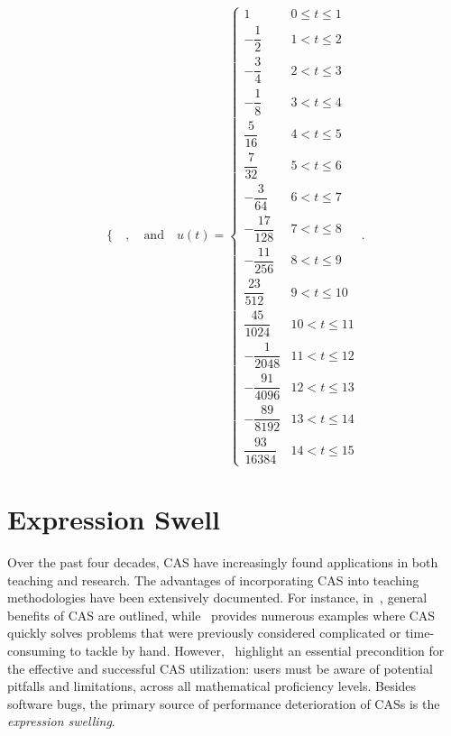 \begin{example}
\begin{equation*}
\begin{cases}
  \end{cases},
  \quad \text{and} \quad u(t) = \begin{cases}
    1 & 0\leq t\leq 1 \\[0.1em]
    -\dfrac{1}{2} & 1<t\leq 2 \\[0.1em]
    -\dfrac{3}{4} & 2<t\leq 3 \\[0.1em]
    -\dfrac{1}{8} & 3<t\leq 4 \\[0.1em]
    \dfrac{5}{16} & 4<t\leq 5 \\[0.1em]
    \dfrac{7}{32} & 5<t\leq 6 \\[0.1em]
    -\dfrac{3}{64} & 6<t\leq 7 \\[0.1em]
    -\dfrac{17}{128} & 7<t\leq 8 \\[0.1em]
    -\dfrac{11}{256} & 8<t\leq 9 \\[0.1em]
    \dfrac{23}{512} & 9<t\leq 10 \\[0.1em]
    \dfrac{45}{1024} & 10<t\leq 11 \\[0.1em]
    -\dfrac{1}{2048} & 11<t\leq 12 \\[0.1em]
    -\dfrac{91}{4096} & 12<t\leq 13 \\[0.1em]
    -\dfrac{89}{8192} & 13<t\leq 14 \\[0.1em]
    \dfrac{93}{16384} & 14<t\leq 15
  \end{cases} \, \text{.}
\end{equation*}
\end{example}


\section{Expression Swell}
\label{chap3:sec:expression_swell}

Over the past four decades, \ac{CAS} have increasingly found applications in both teaching and research. The advantages of incorporating \ac{CAS} into teaching methodologies have been extensively documented. For instance, in~\citet{stoutemyer1984radical}, general benefits of \ac{CAS} are outlined, while~\citet{pavelle1985macsyma} provides numerous examples where \ac{CAS} quickly solves problems that were previously considered complicated or time-consuming to tackle by hand. However,~\citet{mitic1994pitfalls} highlight an essential precondition for the effective and successful \ac{CAS} utilization: users must be aware of potential pitfalls and limitations, across all mathematical proficiency levels. Besides software bugs, the primary source of performance deterioration of \acp{CAS} is the \emph{expression swelling}.

